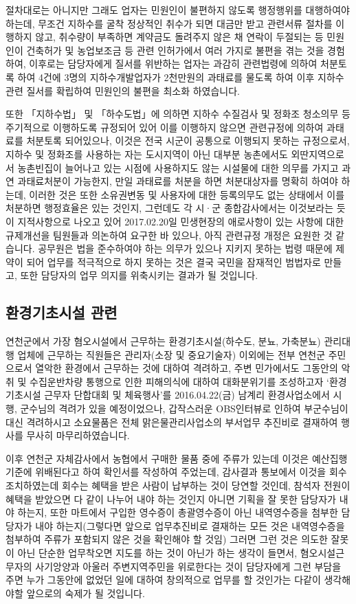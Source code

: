 \documentclass[chapter,book,openany,twoside]{oblivoir}
\begin{document}
절차대로는 아니지만 그래도 업자는 민원인이 불편하지 않도록 행정행위를 대행하여야 하는데, 무조건 지하수를 굴착 정상적인 취수가 되면 대금만 받고 관련서류 절차를 이행하지 않고, 취수량이 부족하면 계약금도 돌려주지 않은 채 연락이 두절되는 등 민원인이 건축허가 및 농업보조금 등 관련 인허가에서 여러 가지로 불편을 겪는 것을 경험하여, 이후로는 담당자에게 질서를 위반하는 업자는 과감히 관련법령에 의하여 처분토록 하여 4건에 3명의 지하수개발업자가 2천만원의 과태료를 물도록 하여 이후 지하수관련 질서를 확립하여 민원인의 불편을 최소화 하였습니다.

또한 「지하수법」 및 「하수도법」에 의하면 지하수 수질검사 및 정화조 청소의무 등 주기적으로 이행하도록 규정되어 있어 이를 이행하지 않으면 관련규정에 의하여 과태료를 처분토록 되어있으나, 이것은 전국 시군이 공통으로 이행되지 못하는 규정으로서, 지하수 및 정화조를 사용하는 자는 도시지역이 아닌 대부분 농촌에서도 외딴지역으로서 농촌빈집이 늘어나고 있는 시점에 사용하지도 않는 시설물에 대한 의무를 가지고 과연 과태료처분이 가능한지, 만일 과태료를 처분을 하면 처분대상자를 명확히 하여야 하는데, 이러한 것은 또한 소유권변동 및 사용자에 대한 등록의무도 없는 상태에서 이를 처분하면 행정효율은 있는 것인지, 그런데도 각 시·군 종합감사에서는 이것보라는 듯이 지적사항으로 나오고 있어 2017.02.20일 민생현장의 애로사항이 있는 사항에 대한 규제개선을 팀원들과 의논하여 요구한 바 있으나, 아직 관련규정 개정은 요원한 것 같습니다.  공무원은 법을 준수하여야 하는 의무가 있으나 지키지 못하는 법령 때문에 제약이 되어 업무를 적극적으로 하지 못하는 것은 결국 국민을 잠재적인 범법자로 만들고, 또한 담당자의 업무 의지를 위축시키는 결과가 될 것입니다. 

\subsection{환경기초시설 관련}

연천군에서 가장 혐오시설에서 근무하는 환경기초시설(하수도, 분뇨, 가축분뇨) 관리대행 업체에 근무하는 직원들은 관리자(소장 및 중요기술자) 이외에는 전부 연천군 주민으로서 열악한 환경에서 근무하는 것에 대하여 격려하고, 주변 민가에서도 그동안의 악취 및 수집운반차량 통행으로 인한 피해의식에 대하여 대화분위기를 조성하고자 `환경기초시설 근무자 단합대회 및 체육행사'를 2016.04.22(금) 남계리 환경사업소에서 시행, 군수님의 격려가 있을 예정이었으나, 갑작스러운 OBS인터뷰로 인하여 부군수님이 대신 격려하시고 소요물품은 전체 맑은물관리사업소의 부서업무 추진비로 결재하여 행사를 무사히 마무리하였습니다.

이후 연천군 자체감사에서 농협에서 구매한 물품 중에 주류가 있는데 이것은 예산집행기준에 위배된다고 하여 확인서를 작성하여 주었는데, 감사결과 통보에서 이것을 회수조치하였는데 회수는 혜택을 받은 사람이 납부하는 것이 당연할 것인데, 참석자 전원이 혜택을 받았으면 다 같이 나누어 내야 하는 것인지 아니면 기획을 잘 못한 담당자가 내야 하는지, 또한 마트에서 구입한 영수증이 총괄영수증이 아닌 내역영수증을 첨부한 담당자가 내야 하는지(그렇다면 앞으로 업무추진비로 결재하는 모든 것은 내역영수증을 첨부하여 주류가 포함되지 않은 것을 확인해야 할 것임) 그러면 그런 것은 의도한 잘못이 아닌 단순한 업무착오면 지도를 하는 것이 아닌가 하는 생각이 들면서, 혐오시설근무자의 사기앙양과 아울러 주변지역주민을 위로한다는 것이 담당자에게 그런 부담을 주면 누가 그동안에 없었던 일에 대하여 창의적으로 업무를 할 것인가는 다같이 생각해야할 앞으로의 숙제가 될 것입니다.
\end{document}
